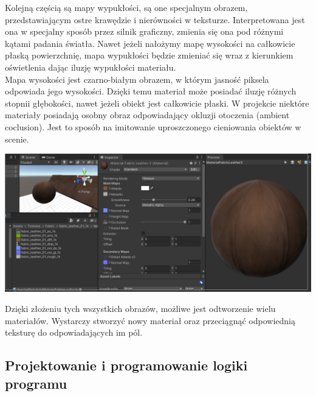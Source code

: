 \documentclass{article} %
\begin{document}
            Kolejną częścią są mapy wypukłości, są one specjalnym obrazem, przedstawiającym ostre krawędzie i nierówności w teksturze. Interpretowana jest ona w specjalny sposób przez silnik graficzny, zmienia się ona pod różnymi kątami padania światła. Nawet jeżeli nałożymy mapę wysokości na całkowicie płaską powierzchnię, mapa wypukłości będzie zmieniać się wraz z kierunkiem oświetlenia dając iluzję wypukłości materiału.
            \\
            
            Mapa wysokości jest czarno-białym obrazem, w którym jasność piksela odpowiada jego wysokości. Dzięki temu materiał może posiadać iluzję różnych stopnii głębokości, nawet jeżeli obiekt jest całkowicie płaski. W projekcie niektóre materiały posiadają osobny obraz odpowiadający okluzji otoczenia (ambient coclusion). Jest to sposób na imitowanie uproszczonego cieniowania obiektów w scenie.
            \\
            
            
            \begin{center}
            \includegraphics[scale=0.4,keepaspectratio=true]{images/screenshots/work/8-tworzenie-materialow_000.png}
            \end{center}

            
            Dzięki złożeniu tych wszystkich obrazów, możliwe jest odtworzenie wielu materiałów. Wystarczy stworzyć nowy materiał oraz przeciągnąć odpowiednią teksturę do odpowiadających im pól. 
            \\

            
    \subsection{Projektowanie i programowanie logiki programu}
    
\end{document}
